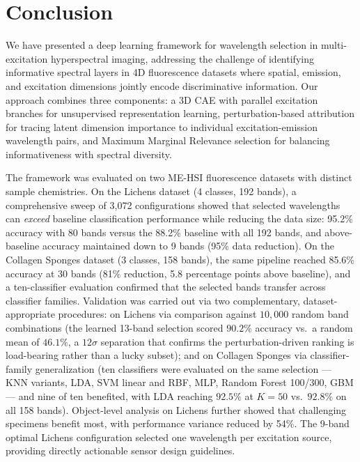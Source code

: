 \section{Conclusion}
\label{sec:conclusion}

We have presented a deep learning framework for wavelength selection in multi-excitation hyperspectral imaging, addressing the challenge of identifying informative spectral layers in 4D fluorescence datasets where spatial, emission, and excitation dimensions jointly encode discriminative information.
Our approach combines three components: a 3D CAE with parallel excitation branches for unsupervised representation learning, perturbation-based attribution for tracing latent dimension importance to individual excitation-emission wavelength pairs, and Maximum Marginal Relevance selection for balancing informativeness with spectral diversity.

The framework was evaluated on two ME-HSI fluorescence datasets with distinct sample chemistries.
On the Lichens dataset (4 classes, 192 bands), a comprehensive sweep of 3,072 configurations showed that selected wavelengths can \emph{exceed} baseline classification performance while reducing the data size: 95.2\% accuracy with 80 bands versus the 88.2\% baseline with all 192 bands, and above-baseline accuracy maintained down to 9 bands (95\% data reduction).
On the Collagen Sponges dataset (3 classes, 158 bands), the same pipeline reached 85.6\% accuracy at 30 bands (81\% reduction, 5.8 percentage points above baseline), and a ten-classifier evaluation confirmed that the selected bands transfer across classifier families.
Validation was carried out via two complementary, dataset-appropriate procedures: on Lichens via comparison against $10{,}000$ random band combinations (the learned 13-band selection scored $90.2\%$ accuracy vs.\ a random mean of $46.1\%$, a $12\sigma$ separation that confirms the perturbation-driven ranking is load-bearing rather than a lucky subset); and on Collagen Sponges via classifier-family generalization (ten classifiers were evaluated on the same selection — KNN variants, LDA, SVM linear and RBF, MLP, Random Forest 100/300, GBM — and nine of ten benefited, with LDA reaching $92.5\%$ at $K=50$ vs.\ $92.8\%$ on all 158 bands).
Object-level analysis on Lichens further showed that challenging specimens benefit most, with performance variance reduced by 54\%.
The 9-band optimal Lichens configuration selected one wavelength per excitation source, providing directly actionable sensor design guidelines.


